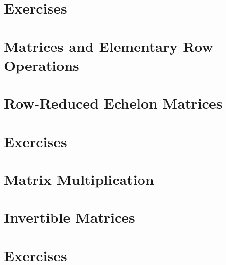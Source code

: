 \section*{Exercises}

\section{Matrices and Elementary Row Operations}

\section{Row-Reduced Echelon Matrices}

\section*{Exercises}

\section{Matrix Multiplication}

\section{Invertible Matrices}

\section*{Exercises}
